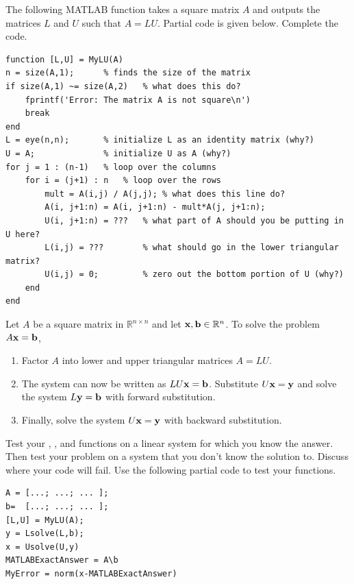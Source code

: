 \begin{technique}[LU Factorization]\label{tech:lu}
    The following MATLAB function takes a square matrix $A$ and
    outputs the matrices $L$ and $U$ such that $A = LU$.  Partial code is given below.
    Complete the code.
\begin{lstlisting}
function [L,U] = MyLU(A)
n = size(A,1);      % finds the size of the matrix
if size(A,1) ~= size(A,2)   % what does this do?
    fprintf('Error: The matrix A is not square\n')
    break
end
L = eye(n,n);       % initialize L as an identity matrix (why?)
U = A;              % initialize U as A (why?)
for j = 1 : (n-1)   % loop over the columns
    for i = (j+1) : n   % loop over the rows
        mult = A(i,j) / A(j,j); % what does this line do?
        A(i, j+1:n) = A(i, j+1:n) - mult*A(j, j+1:n);
        U(i, j+1:n) = ???   % what part of A should you be putting in U here?
        L(i,j) = ???        % what should go in the lower triangular matrix?
        U(i,j) = 0;         % zero out the bottom portion of U (why?)
    end
end
\end{lstlisting}
\end{technique}

\begin{thm}
    Let $A$ be a square matrix in $\mathbb{R}^{n \times n}$ and let ${\bf x}, {\bf b} \in
    \mathbb{R}^n$.  To solve the problem $A {\bf x} ={\bf b}$,
    \begin{enumerate}
        \item Factor $A$ into lower and upper triangular matrices $A = LU$.\\
        \item The system can now be written as $LU {\bf x} = {\bf b}$.  Substitute $U {\bf x} = {\bf
            y}$ and solve the system $L {\bf y} = {\bf b}$ with forward substitution. \\
        \item Finally, solve the system $U {\bf x} = {\bf y}$ with backward substitution. \\
    \end{enumerate}
\end{thm}

\begin{problem}
    Test your , , and  functions on a linear
    system for which you know the answer.  Then test your problem on a system
    that you don't know the solution to.  Discuss where your code will fail. Use the
    following partial code to test your functions.
\begin{lstlisting}
A = [...; ...; ... ];
b=  [...; ...; ... ];
[L,U] = MyLU(A);
y = Lsolve(L,b);
x = Usolve(U,y)
MATLABExactAnswer = A\b
MyError = norm(x-MATLABExactAnswer)
\end{lstlisting}
\end{problem}



